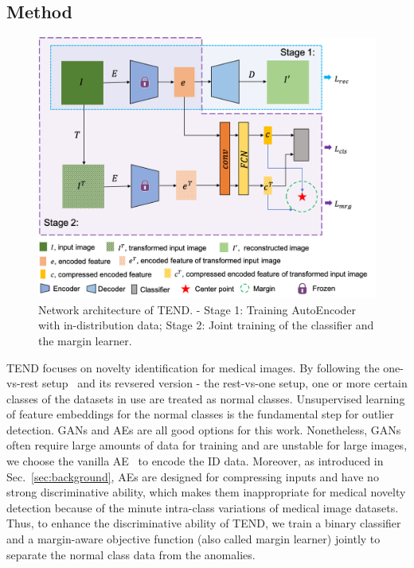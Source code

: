 \documentclass[12pt]{spieman}  %
\begin{document}
\begin{spacing}{2}
\section{Method}



\begin{figure}[tp]
\begin{center}
  \includegraphics[width=0.8\linewidth]{fig1.png}
\end{center}
  \caption{Network architecture of TEND. - Stage 1: Training AutoEncoder with in-distribution data; Stage 2: Joint training of the classifier and the margin learner.} 
\label{fig:model}
\end{figure}


TEND focuses on novelty identification for medical images. By following the one-vs-rest setup~\cite{liznerski2020explainable:explainable} and its revsered version - the rest-vs-one setup, one or more certain classes of the datasets in use are treated as normal classes. Unsupervised learning of feature embeddings for the normal classes is the fundamental step for outlier detection. GANs and AEs are all good options for this work. Nonetheless, GANs often require large amounts of data for training and are unstable for large images, we choose the vanilla AE~\cite{goodfellow2020generative} to encode the ID data. Moreover, as introduced in Sec.~\ref{sec:background}, AEs are designed for compressing inputs and have no strong discriminative ability, which makes them inappropriate for medical novelty detection because of the minute intra-class variations of medical image datasets. Thus, to enhance the discriminative ability of TEND, we train a binary classifier and a margin-aware objective function (also called margin learner) jointly to separate the normal class data from the anomalies. 


\end{spacing}
\end{document}

